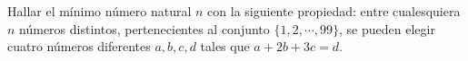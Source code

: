 Hallar el mínimo número natural $n$ con la siguiente propiedad: entre cualesquiera $n$ números distintos, pertenecientes al conjunto $\{ 1,2, \cdots ,99 \}$, se pueden elegir cuatro números diferentes $a,b,c,d$ tales que $a+2b+3c=d$.
